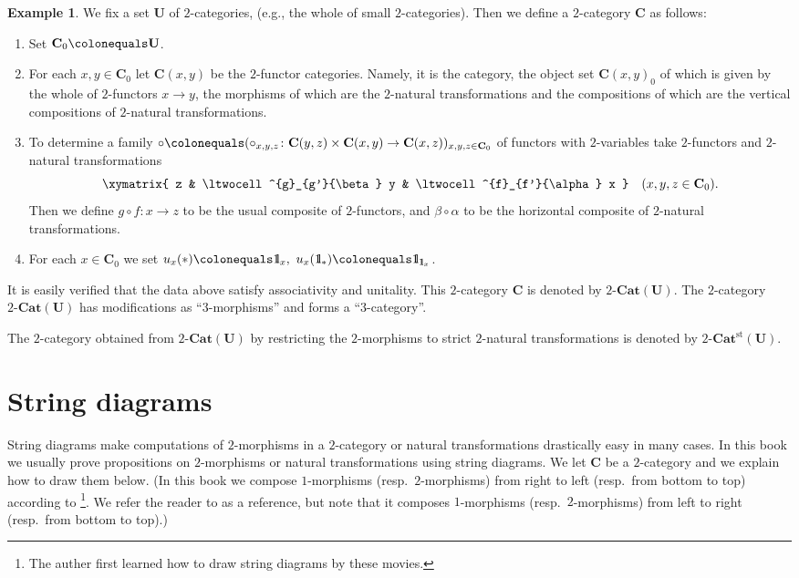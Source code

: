 \documentclass{surv-l}
\numberwithin{equation}{chapter}
\numberwithin{figure}{chapter}
\theoremstyle{plain}
\theoremstyle{definition}
\newtheorem{exm}[thm]{Example}
\theoremstyle{remark}
\newcommand{\id}{1\kern-.25em{\text{{\rm l}}}}
\newcommand{\twoCat}{2\text{-}\mathbf{Cat}}
\newcommand{\twoCatst}{2\text{-}\mathbf{Cat}^{\mathrm{st}}}
\begin{document}
\begin{exm}\label{exm:2-Cat}
We fix a set $\mathbf{U}$ of $2$-categories,
(e.g., the whole of small $2$-categories).
Then we define a $2$-category $\mathbf{C}$ as follows:
\begin{enumerate}
\item
Set $\mathbf{C}_0\colonequals  \mathbf{U}$.
\item
For each $x, y \in \mathbf{C}_0$
let $\mathbf{C}(x,y)$ be the $2$-functor categories.
Namely, it is the category, the object set $\mathbf{C}(x, y)_0$ of which is given by the whole of
$2$-functors $x \to y$, the morphisms of which
are the $2$-natural transformations
and the compositions of which
are the vertical compositions of $2$-natural transformations.
\item
To determine a family $\circ\colonequals  (\circ_{x,y,z} \colon \mathbf{C}(y, z)\times \mathbf{C}(x,y) \to \mathbf{C}(x,z))_{x,y,z \in \mathbf{C}_0}$ of functors with $2$-variables
take $2$-functors and $2$-natural transformations
\[
\xymatrix{
z & \ltwocell^{g}_{g'}{\beta} y & \ltwocell^{f}_{f'}{\alpha} x
}\quad (x, y, z \in \mathbf{C}_0).
\]
Then we define $g\circ f \colon x \to z$ to be the usual composite
of $2$-functors, and
$\beta \circ \alpha$ to be the horizontal composite of $2$-natural transformations.
\item
For each $x \in \mathbf{C}_0$ we set $u_x(*)\colonequals  \id_x,\ u_x(\id_*)\colonequals  \id_{\id_x}$.
\end{enumerate}
It is easily verified that the data above satisfy
associativity and unitality.
This $2$-category $\mathbf{C}$ is denoted by $\twoCat(\mathbf{U})$.
The $2$-category $\twoCat(\mathbf{U})$ has modifications as ``$3$-morphisms''
and forms a ``$3$-category''.

The $2$-category obtained from $\twoCat(\mathbf{U})$ by restricting the $2$-morphisms
to strict $2$-natural transformations is denoted by  $\twoCatst(\mathbf{U})$.
\end{exm}



\section{String diagrams}String diagrams make computations of $2$-morphisms in a $2$-category
or natural transformations drastically easy in many cases.
In this book we usually prove propositions on $2$-morphisms or natural
transformations using string diagrams.
We let $\mathbf{C}$ be a $2$-category and we explain how to draw them below.
(In this book we compose $1$-morphisms (resp.\ $2$-morphisms)
from right to left (resp.\ from bottom to top) according to \cite{TC07}\footnote{The auther first learned how to draw string diagrams by these movies.}.
We refer the reader to \cite[\S 2]{Ma14} as a reference, but note that
it composes $1$-morphisms (resp.\ $2$-morphisms) from left to right
(resp.\ from bottom to top).)
\end{document}
